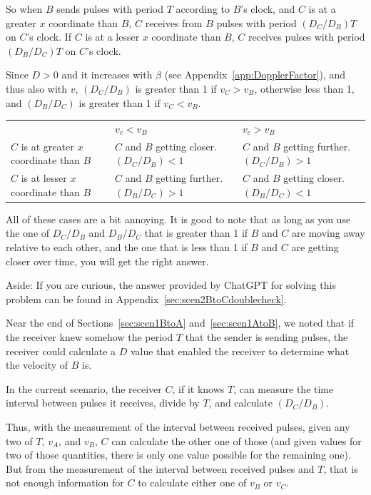 \documentclass[a4paper]{article}
\theoremstyle{plain}
\theoremstyle{definition}
\begin{document}
So when $B$ sends pulses with period $T$ according to $B$'s clock, and
$C$ is at a greater $x$ coordinate than $B$, $C$ receives from $B$
pulses with period $(D_C / D_B) T$ on $C$'s clock.  If $C$ is at a
lesser $x$ coordinate than $B$, $C$ receives pulses with period
$(D_B / D_C) T$ on $C$'s clock.

Since $D > 0$ and it increases with $\beta$ (see
Appendix~\ref{app:DopplerFactor}), and thus also with $v$,
$(D_C / D_B)$ is greater than 1 if $v_C > v_B$, otherwise less than 1,
and $(D_B / D_C)$ is greater than 1 if $v_C < v_B$.

\begin{tabularx}{1.0\textwidth}{|p{4cm}|p{4cm}|p{4cm}|}
\cline{1-3} \\
       & $v_c < v_B$ & $v_c > v_B$ \\ \cline{1-3}
$C$ is at greater $x$ coordinate than $B$ & $C$ and $B$ getting closer.  $(D_C / D_B) < 1$ & $C$ and $B$ getting further.  $(D_C / D_B) > 1$ \\ \cline{1-3}
$C$ is at lesser $x$ coordinate than $B$ & $C$ and $B$ getting further.  $(D_B / D_C) > 1$ & $C$ and $B$ getting closer.  $(D_B / D_C) < 1$ \\ \cline{1-3}
\end{tabularx}

All of these cases are a bit annoying.  It is good to note that as
long as you use the one of $D_C / D_B$ and $D_B / D_C$ that is greater
than 1 if $B$ and $C$ are moving away relative to each other, and the
one that is less than 1 if $B$ and $C$ are getting closer over time,
you will get the right answer.

Aside: If you are curious, the answer provided by ChatGPT for solving
this problem can be found in Appendix~\ref{sec:scen2BtoCdoublecheck}.

Near the end of Sections~\ref{sec:scen1BtoA} and~\ref{sec:scen1AtoB},
we noted that if the receiver knew somehow the period $T$ that the
sender is sending pulses, the receiver could calculate a $D$ value
that enabled the receiver to determine what the velocity of $B$ is.

In the current scenario, the receiver $C$, if it knows $T$, can
measure the time interval between pulses it receives, divide by $T$,
and calculate $(D_C / D_B)$.

Thus, with the measurement of the interval between received pulses,
given any two of $T$, $v_A$, and $v_B$, $C$ can calculate the other
one of those (and given values for two of those quantities, there is
only one value possible for the remaining one).
But from the measurement of the interval between received pulses and
$T$, that is not enough information for $C$ to calculate either one of
$v_B$ or $v_C$.
\end{document}
